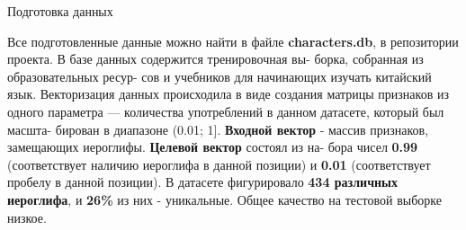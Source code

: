 \documentclass[final]{beamer}
\newlength{\onecolwid}
\newlength{\twocolwid}
\begin{document}
\begin{frame}
\begin{columns}[t]
\begin{column}{\twocolwid}
\begin{columns}[t,totalwidth=\twocolwid]
\begin{column}{\onecolwid}\vspace{-.74in} %


\begin{exampleblock}{Подготовка данных}

Все подготовленные данные можно найти в файле \textbf{characters.db}, в репозитории проекта. В базе данных содержится тренировочная вы- борка, собранная из образовательных ресур- сов и учебников для начинающих изучать китайский язык. \newline
Векторизация данных происходила в виде создания матрицы признаков из одного параметра — количества употреблений в данном датасете, который был масшта- бирован в диапазоне (0.01; 1]. \textbf{Входной вектор} - массив признаков, замещающих иероглифы. \textbf{Целевой вектор} состоял из на- бора чисел \textbf{0.99} (соответствует наличию иероглифа в данной позиции) и \textbf{0.01} (соответствует пробелу в данной позиции). В датасете фигурировало \textbf{434 различных иероглифа}, и \textbf{26\%} из них - уникальные. Общее качество на тестовой выборке низкое.

\end{exampleblock}


\end{column} %

\end{columns} %



\begin{columns}[t,totalwidth=\twocolwid] %

\begin{column}{\onecolwid} %


\end{column}
\end{columns}
\end{column}
\end{columns}
\end{frame}
\end{document}
